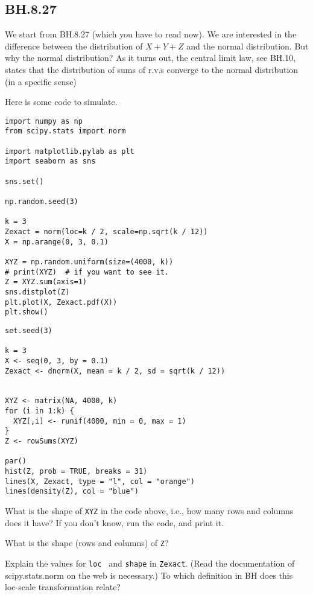 \subsection{BH.8.27}

We start from BH.8.27 (which you have to read now).  We are interested in the difference between the distribution of $X+Y+Z$ and the normal distribution. But why the normal distribution? As it turns out, the central limit law, see BH.10, states that the distribution of sums of r.v.s converge to the normal distribution (in a specific sense)

Here is some code to simulate.

\begin{verbatim}
import numpy as np
from scipy.stats import norm

import matplotlib.pylab as plt
import seaborn as sns

sns.set()

np.random.seed(3)

k = 3
Zexact = norm(loc=k / 2, scale=np.sqrt(k / 12))
X = np.arange(0, 3, 0.1)

XYZ = np.random.uniform(size=(4000, k))
# print(XYZ)  # if you want to see it.
Z = XYZ.sum(axis=1)
sns.distplot(Z)
plt.plot(X, Zexact.pdf(X))
plt.show()
\end{verbatim}

\begin{verbatim}
set.seed(3)

k = 3
X <- seq(0, 3, by = 0.1)
Zexact <- dnorm(X, mean = k / 2, sd = sqrt(k / 12))


XYZ <- matrix(NA, 4000, k)
for (i in 1:k) {
  XYZ[,i] <- runif(4000, min = 0, max = 1)
}
Z <- rowSums(XYZ)

par()
hist(Z, prob = TRUE, breaks = 31)
lines(X, Zexact, type = "l", col = "orange")
lines(density(Z), col = "blue")
\end{verbatim}


\begin{exercise}
What is the shape of \verb|XYZ| in the code above, i.e., how many rows and columns does it have? If you don't know, run the code, and print it.
\end{exercise}

\begin{exercise}
What is the shape (rows and columns) of \verb|Z|?
\end{exercise}

\begin{exercise}
Explain the values for \verb|loc|~ and \verb|shape| in \verb|Zexact|.
  (Read the documentation of scipy.stats.norm on the web is necessary.)
  To which definition in BH does this loc-scale transformation relate?
\end{exercise}


